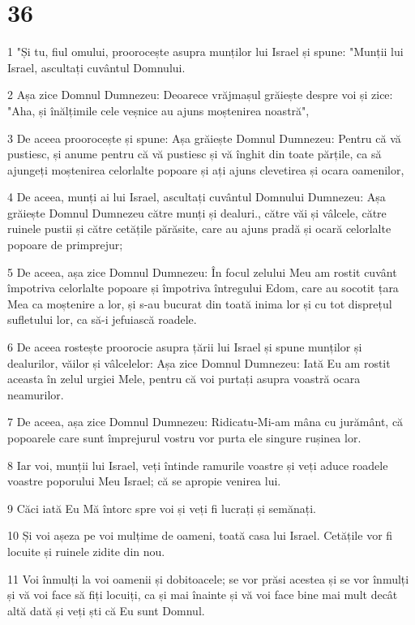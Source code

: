 \chapter{36}

\par 1 "Și tu, fiul omului, proorocește asupra munților lui Israel și spune: "Munții lui Israel, ascultați cuvântul Domnului.
\par 2 Așa zice Domnul Dumnezeu: Deoarece vrăjmașul grăiește despre voi și zice: "Aha, și înălțimile cele veșnice au ajuns moștenirea noastră",
\par 3 De aceea proorocește și spune: Așa grăiește Domnul Dumnezeu: Pentru că vă pustiesc, și anume pentru că vă pustiesc și vă înghit din toate părțile, ca să ajungeți moștenirea celorlalte popoare și ați ajuns clevetirea și ocara oamenilor,
\par 4 De aceea, munți ai lui Israel, ascultați cuvântul Domnului Dumnezeu: Așa grăiește Domnul Dumnezeu către munți și dealuri., către văi și vâlcele, către ruinele pustii și către cetățile părăsite, care au ajuns pradă și ocară celorlalte popoare de primprejur;
\par 5 De aceea, așa zice Domnul Dumnezeu: În focul zelului Meu am rostit cuvânt împotriva celorlalte popoare și împotriva întregului Edom, care au socotit țara Mea ca moștenire a lor, și s-au bucurat din toată inima lor și cu tot disprețul sufletului lor, ca să-i jefuiască roadele.
\par 6 De aceea rostește proorocie asupra țării lui Israel și spune munților și dealurilor, văilor și vâlcelelor: Așa zice Domnul Dumnezeu: Iată Eu am rostit aceasta în zelul urgiei Mele, pentru că voi purtați asupra voastră ocara neamurilor.
\par 7 De aceea, așa zice Domnul Dumnezeu: Ridicatu-Mi-am mâna cu jurământ, că popoarele care sunt împrejurul vostru vor purta ele singure rușinea lor.
\par 8 Iar voi, munții lui Israel, veți întinde ramurile voastre și veți aduce roadele voastre poporului Meu Israel; că se apropie venirea lui.
\par 9 Căci iată Eu Mă întorc spre voi și veți fi lucrați și semănați.
\par 10 Și voi așeza pe voi mulțime de oameni, toată casa lui Israel. Cetățile vor fi locuite și ruinele zidite din nou.
\par 11 Voi înmulți la voi oamenii și dobitoacele; se vor prăsi acestea și se vor înmulți și vă voi face să fiți locuiți, ca și mai înainte și vă voi face bine mai mult decât altă dată și veți ști că Eu sunt Domnul.
